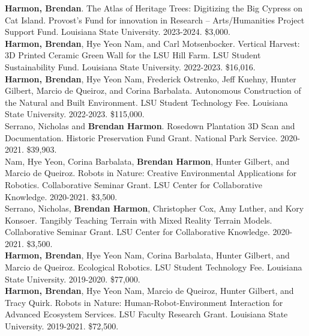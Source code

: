 \documentclass[10pt]{developercv} %
\begin{document}


\textbf{Harmon, Brendan}.
The Atlas of Heritage Trees: Digitizing the Big Cypress on Cat Island.
Provost's Fund for innovation in Research -- Arts/Humanities Project Support Fund. 
Louisiana State University. 
2023-2024. \$3,000.\\

\textbf{Harmon, Brendan}, Hye Yeon Nam, and Carl Motsenbocker.
Vertical Harvest: 3D Printed Ceramic Green Wall for the LSU Hill Farm.
LSU Student Sustainability Fund. 
Louisiana State University. 
2022-2023. \$16,016.\\

\textbf{Harmon, Brendan}, Hye Yeon Nam, Frederick Ostrenko, Jeff Kuehny, Hunter Gilbert, Marcio de Queiroz, and Corina Barbalata. 
Autonomous Construction of the Natural and Built Environment.
LSU Student Technology Fee. 
Louisiana State University. 
2022-2023. \$115,000.\\

Serrano, Nicholas and \textbf{Brendan Harmon}. 
Rosedown Plantation 3D Scan and Documentation. 
Historic Preservation Fund Grant. 
National Park Service. 
2020-2021. \$39,903.\\

Nam, Hye Yeon, Corina Barbalata, \textbf{Brendan Harmon}, Hunter Gilbert, and Marcio de Queiroz.
Robots in Nature: Creative Environmental Applications for Robotics.
Collaborative Seminar Grant. 
LSU Center for Collaborative Knowledge.
2020-2021. \$3,500.\\

Serrano, Nicholas, \textbf{Brendan Harmon}, Christopher Cox, Amy Luther, and Kory Konsoer.
Tangibly Teaching Terrain with Mixed Reality Terrain Models.
Collaborative Seminar Grant. 
LSU Center for Collaborative Knowledge.
2020-2021. \$3,500.\\

\textbf{Harmon, Brendan}, Hye Yeon Nam, Corina Barbalata, Hunter Gilbert, and Marcio de Queiroz.
Ecological Robotics.
LSU Student Technology Fee. 
Louisiana State University. 
2019-2020.	\$77,000.\\

\textbf{Harmon, Brendan}, Hye Yeon Nam, Marcio de Queiroz, Hunter Gilbert, and Tracy Quirk. 
Robots in Nature: Human-Robot-Environment Interaction for Advanced Ecosystem Services. 
LSU Faculty Research Grant. 
Louisiana State University. 
2019-2021. \$72,500.\\
\end{document}
